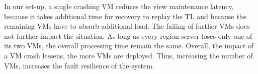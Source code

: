 In our set-up, a single crashing VM reduces the view maintenance
latency, because it takes additional time for recovery to replay the
TL and because the remaining VMs have to absorb additional load.  The
failing of further VMs does not further impact the situation.  As long
as every region server loses only one of its two VMs, the overall
processing time remain the same.  Overall, the impact of a VM crash
lessens, the more VMs are deployed.  Thus, increasing the number of
VMs, increases the fault resilience of the system.

